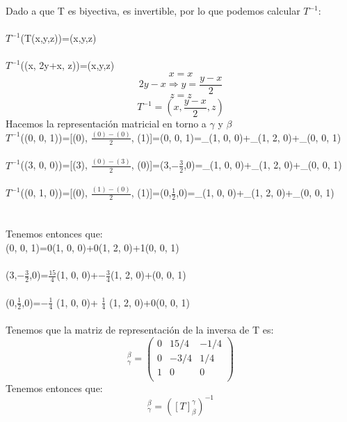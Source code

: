 \begin{enumerate}
    Dado a que T es biyectiva, es invertible, por lo que podemos calcular $T^{-1}$:\\
\\
$T^{-1}$(T(x,y,z))=(x,y,z)\\
\\
$T^{-1}$((x, 2y+x, z))=(x,y,z)
\begin{equation*}
    x=x
\end{equation*}
\begin{equation*}
    2y-x \Longrightarrow y=\frac{y-x}{2}
\end{equation*}
\begin{equation*}
z=z
\end{equation*}
\begin{equation*}
    T^{-1}=(x,\frac{y-x}{2},z)
\end{equation*}
Hacemos la representación matricial en torno a $\gamma$ y $\beta$
\\
$T^{-1}$((0, 0, 1))=[(0), $\frac{(0)-(0)}{2}$, (1)]=(0, 0, 1)=\_(1, 0, 0)+\_(1, 2, 0)+\_(0, 0, 1)\\
\\
$T^{-1}$((3, 0, 0))=[(3), $\frac{(0)-(3)}{2}$, (0)]=(3,$-\frac{3}{2}$,0)=\_(1, 0, 0)+\_(1, 2, 0)+\_(0, 0, 1)\\
\\
$T^{-1}$((0, 1, 0))=[(0), $\frac{(1)-(0)}{2}$, (1)]=(0,$\frac{1}{2}$,0)=\_(1, 0, 0)+\_(1, 2, 0)+\_(0, 0, 1)\\
\\
\\
Tenemos entonces que:\\
(0, 0, 1)=0(1, 0, 0)+0(1, 2, 0)+1(0, 0, 1)\\
\\
(3,$-\frac{3}{2}$,0)=$\frac{15}{4}$(1, 0, 0)+$-\frac{3}{4}$(1, 2, 0)+(0, 0, 1)\\
\\
(0,$\frac{1}{2}$,0)=$-\frac{1}{4}$ (1, 0, 0)+ $\frac{1}{4}$ (1, 2, 0)+0(0, 0, 1)\\
\\
Tenemos que la matriz de representación de la inversa de T es:
\begin{equation*}
    [T^{-1}]^{\beta}_{\gamma} =
    \begin{pmatrix}
        0	& 15/4	& -1/4\\
0	& -3/4	&  1/4\\
1	&    0	&    0\\
    \end{pmatrix}
\end{equation*}
Tenemos entonces que:
\begin{equation*}
     [T^{-1}]^{\beta}_{\gamma}=([T]^{\gamma}_{\beta})^{-1}
\end{equation*}

\end{enumerate}

